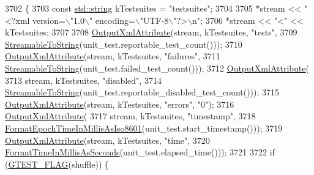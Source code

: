 \begin{DoxyCode}
3702                                                                            \{
3703   \textcolor{keyword}{const} \hyperlink{namespacetesting_1_1internal_a8e8ff5b11e64078831112677156cb111}{std::string} kTestsuites = \textcolor{stringliteral}{"testsuites"};
3704 
3705   *stream << \textcolor{stringliteral}{"<?xml version=\(\backslash\)"1.0\(\backslash\)" encoding=\(\backslash\)"UTF-8\(\backslash\)"?>\(\backslash\)n"};
3706   *stream << \textcolor{stringliteral}{"<"} << kTestsuites;
3707 
3708   \hyperlink{classtesting_1_1internal_1_1XmlUnitTestResultPrinter_aa8ca7066de948d26d171597430c75839}{OutputXmlAttribute}(stream, kTestsuites, \textcolor{stringliteral}{"tests"},
3709                      \hyperlink{namespacetesting_1_1internal_aad4beed95d0846e6ffc5da0978ef3bb9}{StreamableToString}(unit\_test.reportable\_test\_count()));
3710   \hyperlink{classtesting_1_1internal_1_1XmlUnitTestResultPrinter_aa8ca7066de948d26d171597430c75839}{OutputXmlAttribute}(stream, kTestsuites, \textcolor{stringliteral}{"failures"},
3711                      \hyperlink{namespacetesting_1_1internal_aad4beed95d0846e6ffc5da0978ef3bb9}{StreamableToString}(unit\_test.failed\_test\_count()));
3712   \hyperlink{classtesting_1_1internal_1_1XmlUnitTestResultPrinter_aa8ca7066de948d26d171597430c75839}{OutputXmlAttribute}(
3713       stream, kTestsuites, \textcolor{stringliteral}{"disabled"},
3714       \hyperlink{namespacetesting_1_1internal_aad4beed95d0846e6ffc5da0978ef3bb9}{StreamableToString}(unit\_test.reportable\_disabled\_test\_count()));
3715   \hyperlink{classtesting_1_1internal_1_1XmlUnitTestResultPrinter_aa8ca7066de948d26d171597430c75839}{OutputXmlAttribute}(stream, kTestsuites, \textcolor{stringliteral}{"errors"}, \textcolor{stringliteral}{"0"});
3716   \hyperlink{classtesting_1_1internal_1_1XmlUnitTestResultPrinter_aa8ca7066de948d26d171597430c75839}{OutputXmlAttribute}(
3717       stream, kTestsuites, \textcolor{stringliteral}{"timestamp"},
3718       \hyperlink{namespacetesting_1_1internal_a5ef227c4a610e7ff638b12dfb25b068e}{FormatEpochTimeInMillisAsIso8601}(unit\_test.start\_timestamp()));
3719   \hyperlink{classtesting_1_1internal_1_1XmlUnitTestResultPrinter_aa8ca7066de948d26d171597430c75839}{OutputXmlAttribute}(stream, kTestsuites, \textcolor{stringliteral}{"time"},
3720                      \hyperlink{namespacetesting_1_1internal_a904485f27a54be8a5a92856e2d838797}{FormatTimeInMillisAsSeconds}(unit\_test.elapsed\_time()));
3721 
3722   \textcolor{keywordflow}{if} (\hyperlink{gtest-port_8h_a828f4e34a1c4b510da50ec1563e3562a}{GTEST\_FLAG}(shuffle)) \{

\end{DoxyCode}
